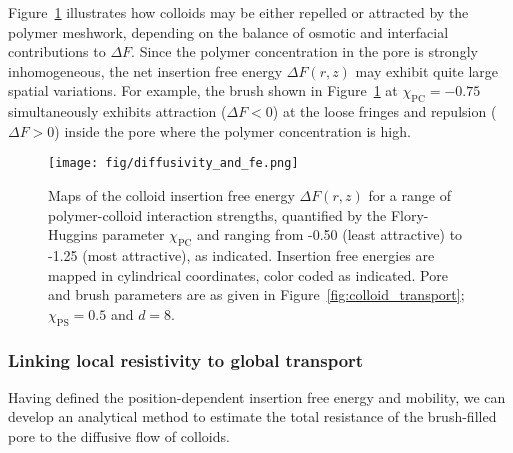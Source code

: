 \documentclass[12pt, a4paper]{article}
\begin{document}
Figure~\ref{fig:DeltaF_map} illustrates how colloids may be either repelled or attracted by the polymer meshwork, depending on the balance of osmotic and interfacial contributions to $\Delta F$.
Since the polymer concentration in the pore is strongly inhomogeneous, the net insertion free energy $\Delta F(r,z)$ may exhibit quite large spatial variations.
For example, the brush shown in Figure~\ref{fig:DeltaF_map} at $\chi_{\text{PC}}=-0.75$ simultaneously exhibits attraction ($\Delta F<0$) at the loose fringes and repulsion ($\Delta F>0$) inside the pore where the polymer concentration is high.

\begin{figure}
    \centering
    \centerline{\texttt{[image: fig/diffusivity\_and\_fe.png]}}
    \caption{
    Maps of the colloid insertion free energy $\Delta F(r,z)$ for a range of polymer-colloid interaction strengths, quantified by the Flory-Huggins parameter $\chi_{\text{PC}}$ and ranging from -0.50 (least attractive) to -1.25 (most attractive), as indicated.
    Insertion free energies are mapped in cylindrical coordinates, color coded as indicated.
    Pore and brush parameters are as given in Figure~\ref{fig:colloid_transport}; $\chi_{\text{PS}}=0.5$ and $d=8$.
    }
    \label{fig:DeltaF_map}
\end{figure}



\subsubsection{Linking local resistivity to global transport}


Having defined the position-dependent insertion free energy and mobility, we can develop an analytical method to estimate the total resistance of the brush-filled pore to the diffusive flow of colloids.
\end{document}
